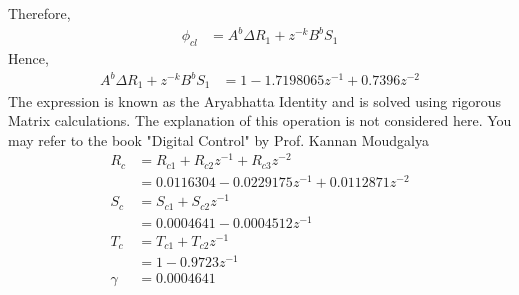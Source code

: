 Therefore,
\begin{align}
\phi_{cl}&=A^b\Delta R_1+z^{-k}B^bS_1
\end{align}
Hence,
\begin{align*}
A^b\Delta R_1+z^{-k}B^bS_1&=1-1.7198065z^{-1}+0.7396z^{-2}
\end{align*}
The expression is known as the Aryabhatta Identity and is solved using rigorous Matrix calculations. The explanation of this operation is not considered here. You may refer to the book "Digital Control" by Prof. Kannan Moudgalya \cite{kmmdc09} 
\begin{align*}
R_c&=R_{c1}+R_{c2}z^{-1}+R_{c3}z^{-2}\\
&=0.0116304-0.0229175z^{-1}+0.0112871z^{-2}\\
S_c&=S_{c1}+S_{c2}z^{-1}\\
&=0.0004641-0.0004512z^{-1}\\
T_c&=T_{c1}+T_{c2}z^{-1}\\
&=1-0.9723z^{-1}\\
\gamma&=0.0004641
\end{align*}

